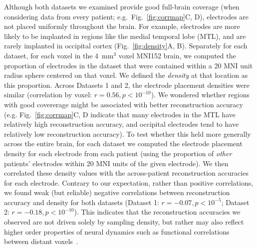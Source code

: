 \documentclass[11pt]{article}
\begin{document}
Although both datasets we examined provide good full-brain coverage
(when considering data from every patient; e.g.\
Fig.~\ref{fig:corrmap}C, D), electrodes are not placed uniformly
throughout the brain.  For example, electrodes are more likely to be
implanted in regions like the medial temporal lobe (MTL), and are
rarely implanted in occipital cortex (Fig.~\ref{fig:density}A, B).
Separately for each dataset, for each voxel in the 4~mm$^3$ voxel
MNI152 brain, we computed the proportion of electrodes in the dataset
that were contained within a 20 MNI unit radius sphere centered on
that voxel.  We defined the \textit{density} at that location as this
proportion.  Across Datasets 1 and 2, the electrode placement
densities were similar (correlation by voxel:
$r = 0.56, p < 10^{-10}$).  We wondered whether regions with good
covererage might be associated with better reconstruction accuracy
(e.g. Fig.~\ref{fig:corrmap}C, D indicate that many electrodes in the
MTL have relatively high reconstruction accuracy, and occipital
electrodes tend to have relatively low reconstruction accuracy).  To
test whether this held more generally across the entire brain, for
each dataset we computed the electrode placement density for each
electrode from each patient (using the proportion of \textit{other}
patients' electrodes within 20 MNI units of the given electrode).  We
then correlated these density values with the across-patient
reconstruction accuracies for each electrode.  Contrary to our
expectation, rather than positive correlations, we found weak (but
reliable) negative correlations between reconstruction accuracy and
density for both datasets (Dataset 1: $r = -0.07, p < 10^{-5}$; Dataset 2:
$r = -0.18, p < 10^{-10}$).  This indicates that the reconstruction
accuracies we observed are not driven solely by sampling density, but
rather may also reflect higher order properties of neural dynamics
such as functional correlations between distant
voxels~\citep{BetzEtal17b}.
\end{document}
